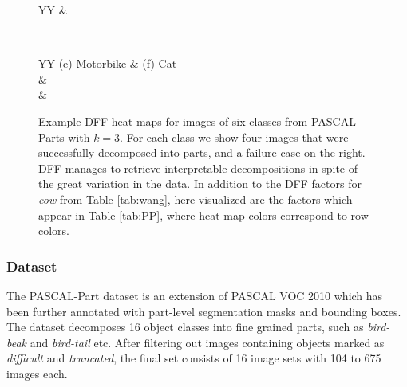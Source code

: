 \documentclass[runningheads]{llncs}
\begin{document}
\begin{figure}[t]
\begin{tabularx}{\textwidth}{YY}
			 & 
			
		\end{tabularx}\\[1ex]
		
		\setlength{\tabcolsep}{0.8pt}
		\begin{tabularx}{\textwidth}{YY}
			(e) Motorbike & (f) Cat \\
			&  \\
			
			 &   
			
		\end{tabularx}
		
		\caption{Example DFF heat maps for images of six classes from PASCAL-Parts with $k=3$. For each class we show four images that were successfully decomposed into parts, and a failure case on the right. DFF manages to retrieve interpretable decompositions in spite of the great variation in the data. In addition to the DFF factors for \emph{cow} from Table \ref{tab:wang}, here visualized are the factors which appear in Table \ref{tab:PP}, where heat map colors correspond to row colors.}  \label{fig:pp-parts}
	\end{figure}
	
	\subsubsection{Dataset}
	The PASCAL-Part dataset \cite{Chen2014} is an extension of PASCAL VOC 2010 \cite{pascal-voc-2010} which has been further annotated with part-level segmentation masks and bounding boxes. The dataset decomposes 16 object classes into fine grained parts, such as \emph{bird-beak} and \emph{bird-tail} etc. After filtering out images containing objects marked as \emph{difficult} and \emph{truncated}, the final set consists of 16 image sets with 104 to 675 images each.
\end{document}
